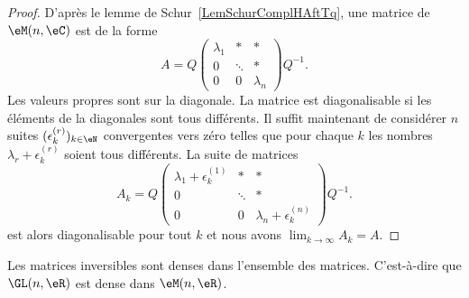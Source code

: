 \begin{proof}
	D'après le lemme de Schur~\ref{LemSchurComplHAftTq}, une matrice de \( \eM(n,\eC)\) est de la forme
	\begin{equation}
		A=Q\begin{pmatrix}
			\lambda_1 & *      & *         \\
			0         & \ddots & *         \\
			0         & 0      & \lambda_n
		\end{pmatrix}Q^{-1}.
	\end{equation}
	Les valeurs propres sont sur la diagonale. La matrice est diagonalisable si les éléments de la diagonales sont tous différents. Il suffit maintenant de considérer \( n\) suites \( (\epsilon^{(r)}_k)_{k\in\eN}\) convergentes vers zéro telles que pour chaque \( k\) les nombres \( \lambda_r+\epsilon^{(r)}_k\) soient tous différents. La suite de matrices
	\begin{equation}
		A_k=Q\begin{pmatrix}
			\lambda_1+\epsilon^{(1)}_k & *      & *                          \\
			0                          & \ddots & *                          \\
			0                          & 0      & \lambda_n+\epsilon^{(n)}_k
		\end{pmatrix}Q^{-1}.
	\end{equation}
	est alors diagonalisable pour tout \( k\) et nous avons \( \lim_{k\to \infty} A_k=A\).
\end{proof}

\begin{proposition} \label{PropQGUPooVudelJ}
	Les matrices inversibles sont denses dans l'ensemble des matrices. C'est-à-dire que \( \GL(n,\eR)\) est dense dans \( \eM(n,\eR)\).
\end{proposition}

